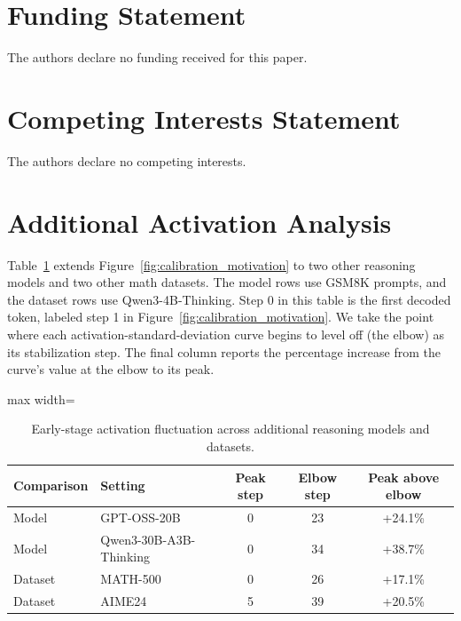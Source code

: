 \documentclass{article}
\begin{document}
\section*{Funding Statement}
The authors declare no funding received for this paper.

\section*{Competing Interests Statement}
The authors declare no competing interests.




\appendix

\section{Additional Activation Analysis}
\label{sec:app:activation_fluctuation}
Table~\ref{tab:app:activation_fluctuation} extends Figure~\ref{fig:calibration_motivation} to two other reasoning models and two other math datasets. The model rows use GSM8K prompts, and the dataset rows use Qwen3-4B-Thinking. Step 0 in this table is the first decoded token, labeled step 1 in Figure~\ref{fig:calibration_motivation}. We take the point where each activation-standard-deviation curve begins to level off (the elbow) as its stabilization step. The final column reports the percentage increase from the curve's value at the elbow to its peak.

\begin{table}[H]
\centering
\caption{Early-stage activation fluctuation across additional reasoning models and datasets.}
\label{tab:app:activation_fluctuation}
{\small
\setlength{\tabcolsep}{3pt}
\begin{adjustbox}{max width=\columnwidth}
\begin{tabular}{llccc}
\toprule
\textbf{Comparison} & \textbf{Setting} & \textbf{Peak step} & \textbf{Elbow step} & \textbf{Peak above elbow} \\
\midrule
Model & GPT-OSS-20B & 0 & 23 & +24.1\% \\
Model & Qwen3-30B-A3B-Thinking & 0 & 34 & +38.7\% \\
Dataset & MATH-500 & 0 & 26 & +17.1\% \\
Dataset & AIME24 & 5 & 39 & +20.5\% \\
\bottomrule
\end{tabular}
\end{adjustbox}
}
\end{table}
\end{document}
